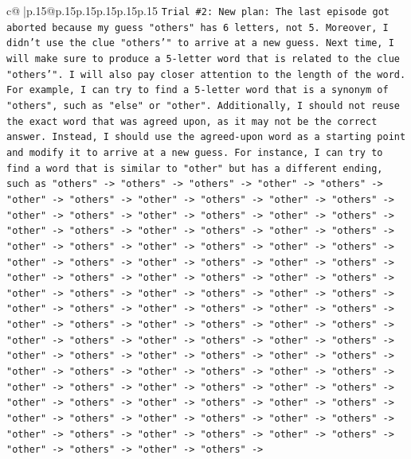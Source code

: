 \documentclass{article}
\begin{document}
{\begin{supertabular}{c@{$\;$}|p{.15\linewidth}@{}p{.15\linewidth}p{.15\linewidth}p{.15\linewidth}p{.15\linewidth}p{.15\linewidth}}
{{{\texttt{Trial \#2: New plan: The last episode got aborted because my guess "others" has 6 letters, not 5. Moreover, I didn't use the clue "others'" to arrive at a new guess. Next time, I will make sure to produce a 5{-}letter word that is related to the clue "others'". I will also pay closer attention to the length of the word. For example, I can try to find a 5{-}letter word that is a synonym of "others", such as "else" or "other". Additionally, I should not reuse the exact word that was agreed upon, as it may not be the correct answer. Instead, I should use the agreed{-}upon word as a starting point and modify it to arrive at a new guess. For instance, I can try to find a word that is similar to "other" but has a different ending, such as "others" {-}> "others" {-}> "others" {-}> "other" {-}> "others" {-}> "other" {-}> "others" {-}> "other" {-}> "others" {-}> "other" {-}> "others" {-}> "other" {-}> "others" {-}> "other" {-}> "others" {-}> "other" {-}> "others" {-}> "other" {-}> "others" {-}> "other" {-}> "others" {-}> "other" {-}> "others" {-}> "other" {-}> "others" {-}> "other" {-}> "others" {-}> "other" {-}> "others" {-}> "other" {-}> "others" {-}> "other" {-}> "others" {-}> "other" {-}> "others" {-}> "other" {-}> "others" {-}> "other" {-}> "others" {-}> "other" {-}> "others" {-}> "other" {-}> "others" {-}> "other" {-}> "others" {-}> "other" {-}> "others" {-}> "other" {-}> "others" {-}> "other" {-}> "others" {-}> "other" {-}> "others" {-}> "other" {-}> "others" {-}> "other" {-}> "others" {-}> "other" {-}> "others" {-}> "other" {-}> "others" {-}> "other" {-}> "others" {-}> "other" {-}> "others" {-}> "other" {-}> "others" {-}> "other" {-}> "others" {-}> "other" {-}> "others" {-}> "other" {-}> "others" {-}> "other" {-}> "others" {-}> "other" {-}> "others" {-}> "other" {-}> "others" {-}> "other" {-}> "others" {-}> "other" {-}> "others" {-}> "other" {-}> "others" {-}> "other" {-}> "others" {-}> "other" {-}> "others" {-}> "other" {-}> "others" {-}> "other" {-}> "others" {-}> "other" {-}> "others" {-}> "other" {-}> "others" {-}> "other" {-}> "others" {-}> "other" {-}> "others" {-}> "other" {-}> "others" {-}> "other" {-}> "others" {-}>} \\
\\ 
}}}
\end{supertabular}}
\end{document}
